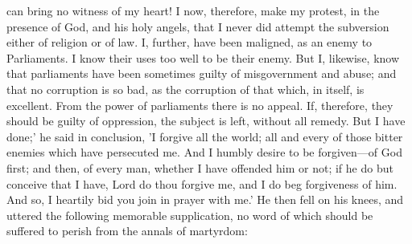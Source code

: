 can bring no witness of my heart! I now, therefore, make my protest, in
the presence of God, and his holy angels, that I never did attempt the
subversion either of religion or of law. I, further, have been maligned,
as an enemy to Parliaments. I know their uses too well to be their
enemy. But I, likewise, know that parliaments have been sometimes guilty
of misgovernment and abuse; and that no corruption is so bad, as the
corruption of that which, in itself, is excellent. From the power of
parliaments there is no appeal. If, therefore, they should be guilty of
oppression, the subject is left, without all remedy. But I have done;'
he said in conclusion, 'I forgive all the world; all and every of those
bitter enemies which have persecuted me. And I humbly desire to be
forgiven—of God first; and then, of every man, whether I have offended
him or not; if he do but conceive that I have, Lord do thou forgive me,
and I do beg forgiveness of him. And so, I heartily bid you join in
prayer with me.' He then fell on his knees, and uttered the following
memorable supplication, no word of which should be suffered to perish
from the annals of martyrdom:

